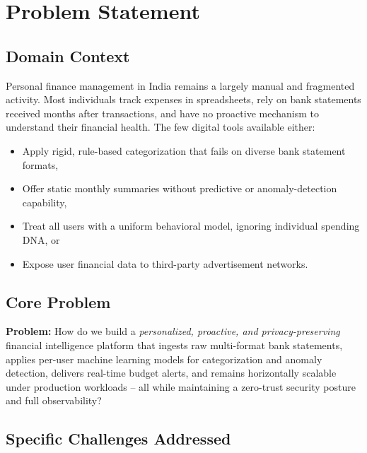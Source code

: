 \documentclass[12pt,a4paper]{report}
\begin{document}
\chapter{Problem Statement}

\section{Domain Context}

Personal finance management in India remains a largely manual and fragmented activity. Most individuals track expenses in spreadsheets, rely on bank statements received months after transactions, and have no proactive mechanism to understand their financial health. The few digital tools available either:

\begin{itemize}[leftmargin=1.5em]
  \item Apply rigid, rule-based categorization that fails on diverse bank statement formats,
  \item Offer static monthly summaries without predictive or anomaly-detection capability,
  \item Treat all users with a uniform behavioral model, ignoring individual spending DNA, or
  \item Expose user financial data to third-party advertisement networks.
\end{itemize}

\section{Core Problem}

\begin{tcolorbox}[enhanced, colback=primary!5, colframe=primary, arc=4pt, left=8pt, top=8pt]
\textbf{Problem:} How do we build a \emph{personalized, proactive, and privacy-preserving} financial intelligence platform that ingests raw multi-format bank statements, applies per-user machine learning models for categorization and anomaly detection, delivers real-time budget alerts, and remains horizontally scalable under production workloads -- all while maintaining a zero-trust security posture and full observability?
\end{tcolorbox}

\section{Specific Challenges Addressed}
\end{document}
